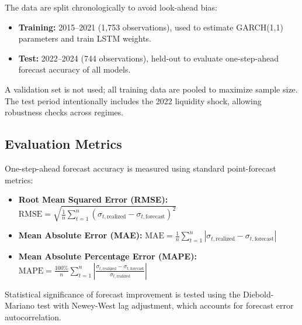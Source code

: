 The data are split chronologically to avoid look-ahead bias:
\begin{itemize}
    \item \textbf{Training:} 2015--2021 (1,753 observations), used to estimate GARCH(1,1) parameters and train LSTM weights.
    \item \textbf{Test:} 2022--2024 (744 observations), held-out to evaluate one-step-ahead forecast accuracy of all models.
\end{itemize}

A validation set is not used; all training data are pooled to maximize sample size. The test period intentionally includes the 2022 liquidity shock, allowing robustness checks across regimes.

\subsection{Evaluation Metrics}

One-step-ahead forecast accuracy is measured using standard point-forecast metrics:
\begin{itemize}
    \item \textbf{Root Mean Squared Error (RMSE):} $\text{RMSE} = \sqrt{\frac{1}{n} \sum_{t=1}^{n} (\sigma_{t,\text{realized}} - \sigma_{t,\text{forecast}})^2}$
    \item \textbf{Mean Absolute Error (MAE):} $\text{MAE} = \frac{1}{n} \sum_{t=1}^{n} |\sigma_{t,\text{realized}} - \sigma_{t,\text{forecast}}|$
    \item \textbf{Mean Absolute Percentage Error (MAPE):} $\text{MAPE} = \frac{100\%}{n} \sum_{t=1}^{n} \left|\frac{\sigma_{t,\text{realized}} - \sigma_{t,\text{forecast}}}{\sigma_{t,\text{realized}}}\right|$
\end{itemize}

Statistical significance of forecast improvement is tested using the Diebold-Mariano test with Newey-West lag adjustment, which accounts for forecast error autocorrelation.

